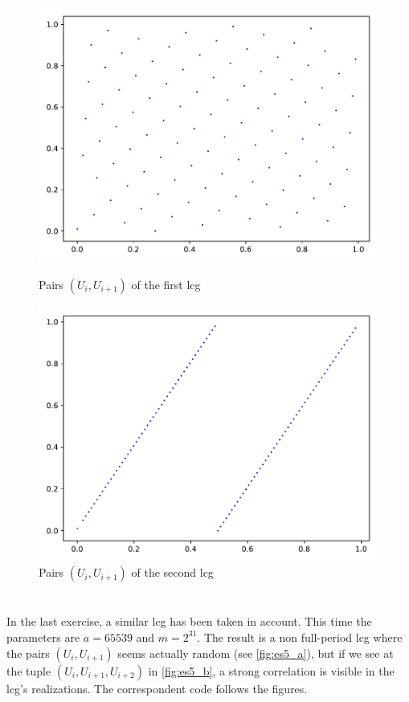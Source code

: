 \documentclass[11pt,a4paper]{article}
\begin{document}
\begin{figure}[ht]
	\centering
	\begin{minipage}{0.45\textwidth}
		\centering
		\includegraphics[width=\textwidth]{es4_a}
		\caption{Pairs $(U_i, U_{i+1})$ of the first \gls{lcg}}
		\label{fig:es4_a}
	\end{minipage}
	\begin{minipage}{0.45\textwidth}
		\centering
		\includegraphics[width=\textwidth]{es4_b}
		\caption{Pairs $(U_i, U_{i+1})$ of the second \gls{lcg}}
    \label{fig:es4_b}
	\end{minipage}
\end{figure}

\section{}
In the last exercise, a similar \gls{lcg} has been taken in account. This time the parameters are  $a = 65539$ and $m = 2^{31}$. The result is a non full-period \gls{lcg} where the pairs  $(U_i, U_{i+1})$ seems actually random (see \autoref{fig:es5_a}), but if we see at the tuple  $(U_i, U_{i+1}, U_{i+2})$ in \autoref{fig:es5_b}, a strong correlation is visible in the \gls{lcg}'s realizations. The correspondent code follows the figures.
\end{document}

